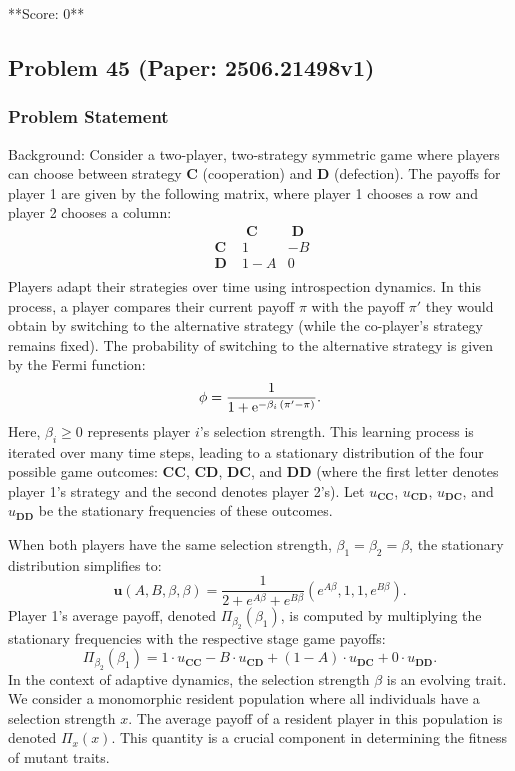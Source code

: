 \documentclass[10pt]{article}
\begin{document}
**Score: 0**

\newpage
\subsection*{Problem 45 (Paper: 2506.21498v1)}
\subsubsection*{Problem Statement}
Background:
Consider a two-player, two-strategy symmetric game where players can choose between strategy $\mathbf{C}$ (cooperation) and $\mathbf{D}$ (defection). The payoffs for player 1 are given by the following matrix, where player 1 chooses a row and player 2 chooses a column:
\begin{equation*}
	\begin{array}{c|cc}
		&\mathbf{\;C\;} &\mathbf{\;D\;}\\
		\hline
		\mathbf{\;C\;} &1 &-B \\
		\mathbf{\;D\;} &1-A &0 \\
	\end{array}
\end{equation*}
Players adapt their strategies over time using introspection dynamics. In this process, a player compares their current payoff $\pi$ with the payoff $\pi'$ they would obtain by switching to the alternative strategy (while the co-player's strategy remains fixed). The probability of switching to the alternative strategy is given by the Fermi function:
\begin{equation*}
	\phi=\frac{1}{1+{\rm e}^{-\beta_i\, (\pi' - \pi)}}.
\end{equation*}
Here, $\beta_i \ge 0$ represents player $i$'s selection strength. This learning process is iterated over many time steps, leading to a stationary distribution of the four possible game outcomes: $\mathbf{CC}$, $\mathbf{CD}$, $\mathbf{DC}$, and $\mathbf{DD}$ (where the first letter denotes player 1's strategy and the second denotes player 2's). Let $u_{\textbf{CC}}$, $u_{\textbf{CD}}$, $u_{\textbf{DC}}$, and $u_{\textbf{DD}}$ be the stationary frequencies of these outcomes.

When both players have the same selection strength, $\beta_1 = \beta_2 = \beta$, the stationary distribution simplifies to:
\begin{equation*}
	\mathbf{u}(A, B, \beta, \beta)= \frac{1}{2 + e^{A \beta} + e^{B \beta}}(e^{A \beta},1,1,e^{B \beta}).
\end{equation*}
Player 1's average payoff, denoted $\Pi_{\beta_2}(\beta_1)$, is computed by multiplying the stationary frequencies with the respective stage game payoffs:
\begin{equation*}
\Pi_{\beta_2}(\beta_1) = 1 \cdot u_\textbf{CC} -B\cdot u_\textbf{CD} +(1-\!A)\cdot u_\textbf{DC}+0\cdot u_\textbf{DD}.
\end{equation*}
In the context of adaptive dynamics, the selection strength $\beta$ is an evolving trait. We consider a monomorphic resident population where all individuals have a selection strength $x$. The average payoff of a resident player in this population is denoted $\Pi_x(x)$. This quantity is a crucial component in determining the fitness of mutant traits.
\end{document}

